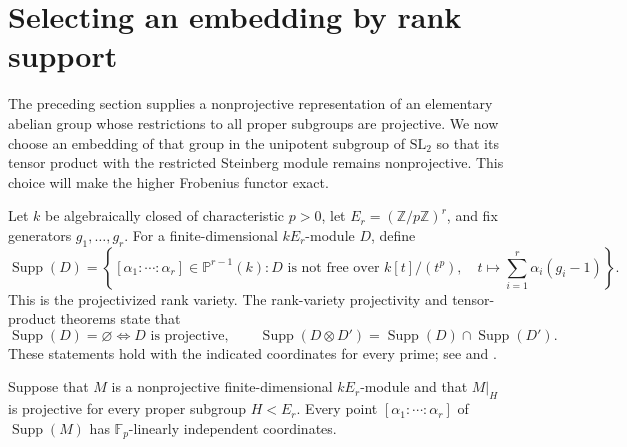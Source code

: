 \section{Selecting an embedding by rank support}
\label{sec:support}

The preceding section supplies a nonprojective representation of an
elementary abelian group whose restrictions to all proper subgroups are
projective.  We now choose an embedding of that group in the unipotent
subgroup of $\mathrm{SL}_2$ so that its tensor product with the restricted
Steinberg module remains nonprojective.  This choice will make the higher
Frobenius functor exact.

Let $k$ be algebraically closed of characteristic $p>0$, let
$E_r=(\mathbb Z/p\mathbb Z)^r$, and fix generators $g_1,\ldots,g_r$.
For a finite-dimensional $kE_r$-module $D$, define
\[
 \operatorname{Supp}(D)=
 \left\{[\alpha_1:\cdots:\alpha_r]\in\mathbb P^{r-1}(k):
 D\text{ is not free over }k[t]/(t^p),\quad
 t\mapsto\sum_{i=1}^r\alpha_i(g_i-1)\right\}.
\]
This is the projectivized rank variety.  The rank-variety projectivity
and tensor-product theorems state that
\begin{equation}\label{eq:support-properties}
 \operatorname{Supp}(D)=\varnothing\iff D\text{ is projective},
 \qquad
 \operatorname{Supp}(D\otimes D')
 =\operatorname{Supp}(D)\cap\operatorname{Supp}(D').
\end{equation}
These statements hold with the indicated coordinates for every prime;
see \cite[Sections~1.9 and~1.12]{Benson2017} and
\cite[Section~2.3]{CoulembierFlakeSteinberg}.

\begin{lemma}\label{lem:support-independent}
Suppose that $M$ is a nonprojective finite-dimensional $kE_r$-module and
that $M|_H$ is projective for every proper subgroup $H<E_r$.
Every point $[\alpha_1:\cdots:\alpha_r]$ of $\operatorname{Supp}(M)$ has
$\mathbb F_p$-linearly independent coordinates.
\end{lemma}

